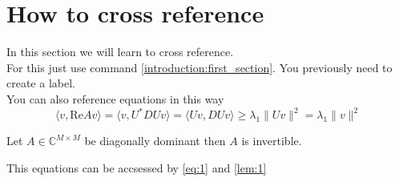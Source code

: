 \section{How to cross reference}
In this section we will learn to cross reference.\\
For this just use command \ref{introduction:first_section}.  You previously need to create a label.\\
You can also reference equations in this way
\begin{equation}
\label{eq:1}
\langle v,\text{Re}A v\rangle =\langle v,U^*DUv\rangle=\langle Uv,DUv\rangle\geq \lambda_1\|Uv\|^2=\lambda_1\|v\|^2
\end{equation}

\begin{lem}
\label{lem:1}
Let $A\in \mathbb{C}^{M\times M}$ be diagonally dominant then $A$ is invertible.
\end{lem}

This equations can be accsessed by \ref{eq:1} and \ref{lem:1}